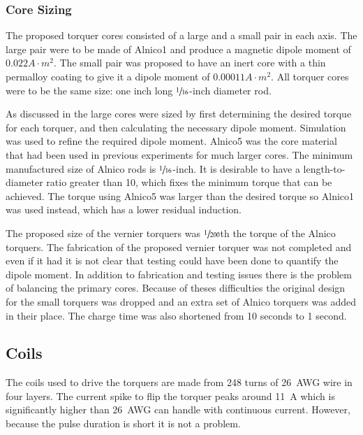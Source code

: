 \subsubsection{Core Sizing}

The proposed torquer cores consisted of a large and a small pair in each axis. The large pair were to be made of Alnico1 and produce a magnetic dipole moment of $0.022 \unit{A \cdot m^2}$. The small pair was proposed to have an inert core with a thin permalloy coating to give it a dipole moment of $0.00011 \unit{A \cdot m^2}$. All torquer cores were to be the same size: one inch long $\sfrac{1}{16}$-inch diameter rod.

As discussed in \cite{Mentch11} the large cores were sized by first determining the desired torque for each torquer, and then calculating the necessary dipole moment. Simulation was used to refine the required dipole moment. Alnico5 was the core material that had been used in previous experiments for much larger cores\cite{Mentch11}. The minimum manufactured size of Alnico rods is $\sfrac{1}{16}$-inch. It is desirable to have a length-to-diameter ratio greater than 10, which fixes the minimum torque that can be achieved. The torque using Alnico5 was larger than the desired torque so Alnico1 was used instead, which has a lower residual induction. 

The proposed size of the vernier torquers was $\sfrac{1}{200}$th the torque of the Alnico torquers. The fabrication of the proposed vernier torquer was not completed and even if it had it is not clear that testing could have been done to quantify the dipole moment. In addition to fabrication and testing issues there is the problem of balancing the primary cores. Because of theses difficulties the original design for the small torquers was dropped and an extra set of Alnico torquers was added in their place. The charge time was also shortened from 10 seconds to 1 second.

\subsection{Coils}

The coils used to drive the torquers are made from 248 turns of 26~AWG wire in four layers. The current spike to flip the torquer peaks around 11~A which is significantly higher than 26~AWG can handle with continuous current. However, because the pulse duration is short it is not a problem.


